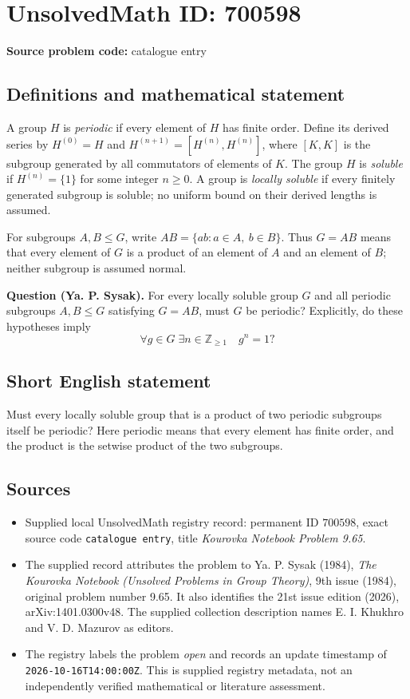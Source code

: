 \documentclass[11pt]{article}
\newcommand{\Z}{\mathbb{Z}}
\begin{document}
\section*{UnsolvedMath ID: 700598}
\textbf{Source problem code:} catalogue entry
\subsection{Definitions and mathematical statement}
A group \(H\) is \emph{periodic} if every element of \(H\) has finite order. Define its derived series by \(H^{(0)}=H\) and \(H^{(n+1)}=[H^{(n)},H^{(n)}]\), where \([K,K]\) is the subgroup generated by all commutators of elements of \(K\). The group \(H\) is \emph{soluble} if \(H^{(n)}=\{1\}\) for some integer \(n\geq 0\). A group is \emph{locally soluble} if every finitely generated subgroup is soluble; no uniform bound on their derived lengths is assumed.

For subgroups \(A,B\leq G\), write \(AB=\{ab:a\in A,\ b\in B\}\). Thus \(G=AB\) means that every element of \(G\) is a product of an element of \(A\) and an element of \(B\); neither subgroup is assumed normal.

\textbf{Question (Ya. P. Sysak).} For every locally soluble group \(G\) and all periodic subgroups \(A,B\leq G\) satisfying \(G=AB\), must \(G\) be periodic? Explicitly, do these hypotheses imply
\[
\forall g\in G\;\exists n\in\Z_{\geq 1}\quad g^n=1?
\]
\subsection{Short English statement}
Must every locally soluble group that is a product of two periodic subgroups itself be periodic? Here periodic means that every element has finite order, and the product is the setwise product of the two subgroups.
\subsection{Sources}
\begin{itemize}
\item Supplied local UnsolvedMath registry record: permanent ID \(700598\), exact source code \texttt{catalogue entry}, title \emph{Kourovka Notebook Problem 9.65}.
\item The supplied record attributes the problem to Ya. P. Sysak (1984), \emph{The Kourovka Notebook (Unsolved Problems in Group Theory)}, 9th issue (1984), original problem number 9.65. It also identifies the 21st issue edition (2026), arXiv:1401.0300v48. The supplied collection description names E. I. Khukhro and V. D. Mazurov as editors.
\item The registry labels the problem \emph{open} and records an update timestamp of \texttt{2026-10-16T14:00:00Z}. This is supplied registry metadata, not an independently verified mathematical or literature assessment.
\end{itemize}
\end{document}
